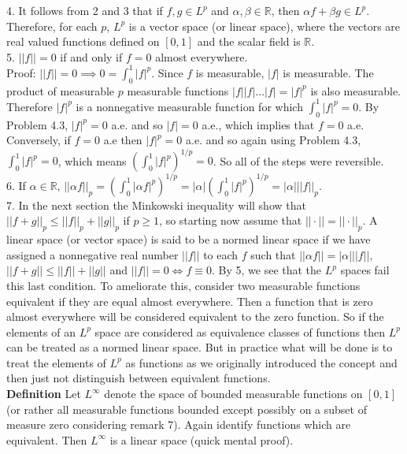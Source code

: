 \documentclass[a4paper]{article}
\begin{document}
4. It follows from 2 and 3 that if $f,g \in L^p$ and $\alpha, \beta \in \mathbb{R}$, then $\alpha f + \beta g \in L^p$. Therefore, for each $p$, $L^p$ is a vector space (or linear space), where the vectors are real valued functions defined on $[0,1]$ and the scalar field is $\mathbb{R}$.\\

5. $||f|| = 0$ if and only if $f = 0$ almost everywhere. \\

Proof: $||f|| = 0 \implies 0 = \int_0^1 |f|^p$. Since $f$ is measurable, $|f|$ is measurable. The product of measurable $p$ measurable functions $|f| |f| ... |f| = |f|^p$ is also measurable. Therefore $|f|^p$ is a nonnegative measurable function for which $\int_0^1 |f|^p = 0$. By Problem 4.3, $|f|^p = 0$ a.e. and so $|f| = 0$ a.e., which implies that $f = 0$ a.e. Conversely, if $f = 0$ a.e then $|f|^p = 0$ a.e. and so again using Problem 4.3, $\int_0^1 |f|^p = 0$, which means $(\int_0^1 |f|^p)^{1/p} = 0$. So all of the steps were reversible. \\

6. If $\alpha \in \mathbb{R}$, $||\alpha f||_p = \left(\int_0^1 |\alpha f|^p\right)^{1/p} = |\alpha|\left( \int_0^1 |f|^p \right)^{1/p} = |\alpha| ||f ||_p$. \\

7. In the next section the Minkowski inequality will show that $||f + g||_p \leq ||f||_p + ||g||_p$ if $p\geq 1$, so starting now assume that $||\cdot || = || \cdot ||_p$. A linear space (or vector space) is said to be a normed linear space if we have assigned a nonnegative real number $||f||$ to each $f$ such that $||\alpha f|| = |\alpha| ||f||$, $||f + g|| \leq ||f|| + ||g||$ and $||f|| = 0 \iff f \equiv 0$. By 5, we see that the $L^p$ spaces fail this last condition. To ameliorate this, consider two measurable functions equivalent if they are equal almost everywhere. Then a function that is zero almost everywhere will be considered equivalent to the zero function. So if the elements of an $L^p$ space are considered as equivalence classes of functions then $L^p$ can be treated as a normed linear space. But in practice what will be done is to treat the elements of $L^p$ as functions as we originally introduced the concept and then just not distinguish between equivalent functions. \\

{\bf Definition} Let $L^\infty$ denote the space of bounded measurable functions on $[0,1]$ (or rather all measurable functions bounded except possibly on a subset of measure zero considering remark 7). Again identify functions which are equivalent. Then $L^\infty$ is a linear space (quick mental proof).
\end{document}
